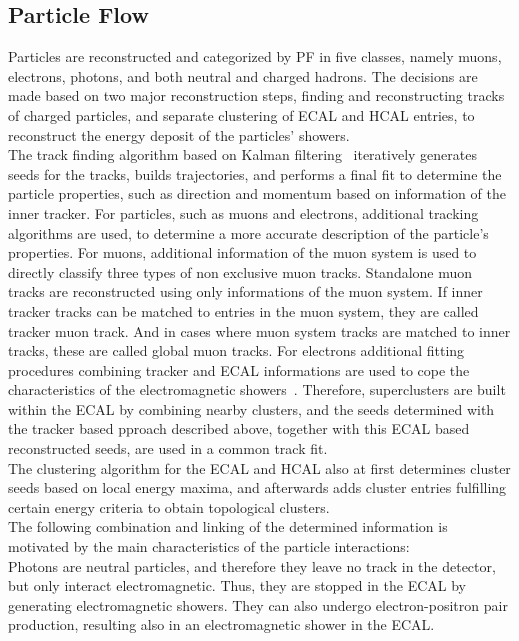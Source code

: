 \subsection{Particle Flow}
Particles are reconstructed and categorized by PF in five classes, namely muons, electrons, photons, and both neutral and charged hadrons. The decisions are made based on two major reconstruction steps, finding and reconstructing tracks of charged particles, and separate clustering of ECAL and HCAL entries, to reconstruct the energy deposit of the particles' showers.\\
The track finding algorithm based on Kalman filtering~\cite{Kalman} iteratively generates seeds for the tracks, builds trajectories, and performs a final fit to determine the particle properties, such as direction and momentum based on information of the inner tracker.
For particles, such as muons and electrons, additional tracking algorithms are used, to determine a more accurate description of the particle's properties. For muons, additional information of the muon system is used to directly classify three types of non exclusive muon tracks. Standalone muon tracks are reconstructed using only informations of the muon system. If inner tracker tracks can be matched to entries in the muon system, they are called tracker muon track. And in cases where muon system tracks are matched to inner tracks, these are called global muon tracks.
For electrons additional fitting procedures combining tracker and ECAL informations are used to cope the characteristics of the electromagnetic showers~\cite{GSFTrack}. Therefore, superclusters are built within the ECAL by combining nearby clusters, and the seeds determined with the tracker based pproach described above, together with this ECAL based reconstructed seeds, are used in a common track fit.\\
The clustering algorithm for the ECAL and HCAL also at first determines cluster seeds based on local energy maxima, and afterwards adds cluster entries fulfilling certain energy criteria to obtain topological clusters.\\
The following combination and linking of the determined information is motivated by the main characteristics of the particle interactions:\\
Photons are neutral particles, and therefore they leave no track in the detector, but only interact electromagnetic. Thus, they are stopped in the ECAL by generating electromagnetic showers. They can also undergo electron-positron pair production, resulting also in an electromagnetic shower in the ECAL.\\
